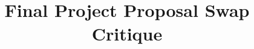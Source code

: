%
%
%
%
%
%
%
%
%
%
%
%
%

\documentclass[11pt]{article}

\usepackage[english]{babel}
\usepackage[utf8]{inputenc}
\usepackage[colorlinks = true,
            linkcolor = blue,
            urlcolor  = blue]{hyperref}
\usepackage[a4paper,margin=1.5in]{geometry}
\usepackage{stackengine,graphicx}
\usepackage{fancyhdr}
\setlength{\headheight}{15pt}
\usepackage{microtype}
\usepackage{times}
\usepackage{booktabs}

\usepackage[numbered,framed]{matlab-prettifier}

\frenchspacing
\setlength{\parindent}{0cm} %
\setlength{\parskip}{0.3cm plus1mm minus1mm}

\pagestyle{fancy}
\fancyhf{}
\rfoot{\thepage}

\date{}

\title{\vspace{-1cm}Final Project Proposal Swap Critique}


\maketitle
\vspace{-1cm}
\thispagestyle{fancy}

